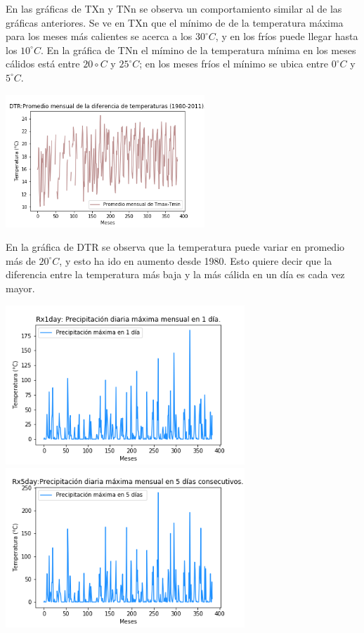 \documentclass[letterpaper,12pt]{article}
\begin{document}
En las gráficas de TXn y TNn se observa un comportamiento similar al de las gráficas anteriores. Se ve en TXn que el mínimo de de la temperatura máxima para los meses más calientes se acerca a los $30^\circ C$, y en los fríos puede llegar hasta los $10^\circ C$. En la gráfica de TNn el mímino de la temperatura mínima en los meses cálidos está entre $20\circ C$ y $25^\circ C$; en los meses fríos el mínimo se ubica entre $0^\circ C$ y $5^\circ C$.

\begin{center}
   \includegraphics[height=5cm]{grafica9.png}
    \label{graf9}
\end{center}

En la gráfica de DTR se observa que la temperatura puede variar en promedio más de $20^\circ C$, y esto ha ido en aumento desde 1980. Esto quiere decir que la diferencia entre la temperatura más baja y la más cálida en un día es cada vez mayor. 

\begin{center} 
\includegraphics[height=6cm]{grafica10.png}\hspace*{\fill}
	\label{graf10}
\includegraphics[height=6cm]{grafica11.png}
    \label{graf11}
\end{center}
\end{document}
